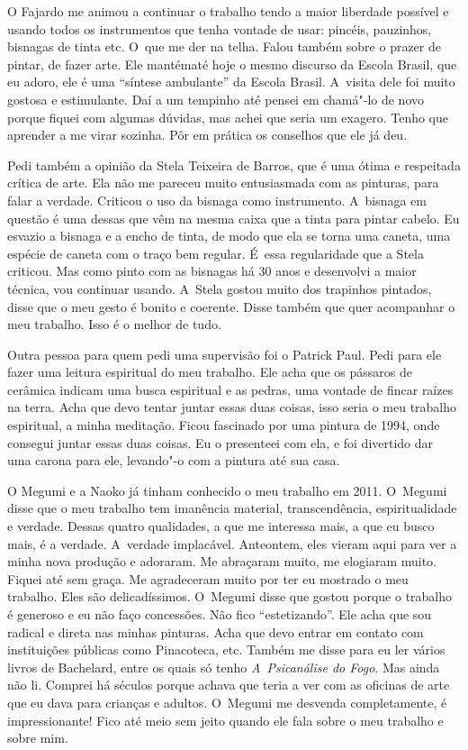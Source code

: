 O Fajardo me animou a continuar o trabalho tendo a maior liberdade
possível e usando todos os instrumentos que tenha vontade de usar:
pincéis, pauzinhos, bisnagas de tinta etc. O~que me der na telha. Falou
também sobre o prazer de pintar, de fazer arte. Ele mantématé hoje o
mesmo discurso da Escola Brasil, que eu adoro, ele é uma ``síntese
ambulante'' da Escola Brasil. A~visita dele foi muito gostosa e
estimulante. Daí a um tempinho até pensei em chamá"-lo de novo porque
fiquei com algumas dúvidas, mas achei que seria um exagero. Tenho que
aprender a me virar sozinha. Pôr em prática os conselhos que ele já deu.

Pedi também a opinião da Stela Teixeira de Barros, que é uma ótima e
respeitada crítica de arte. Ela não me pareceu muito entusiasmada com as
pinturas, para falar a verdade. Criticou o uso da bisnaga como
instrumento. A~bisnaga em questão é uma dessas que vêm na mesma caixa
que a tinta para pintar cabelo. Eu esvazio a bisnaga e a encho de tinta,
de modo que ela se torna uma caneta, uma espécie de caneta com o traço
bem regular. É~essa regularidade que a Stela criticou. Mas como pinto
com as bisnagas há 30 anos e desenvolvi a maior técnica, vou continuar
usando. A~Stela gostou muito dos trapinhos pintados, disse que o meu
gesto é bonito e coerente. Disse também que quer acompanhar o meu
trabalho. Isso é o melhor de tudo.

Outra pessoa para quem pedi uma supervisão foi o Patrick Paul. Pedi para
ele fazer uma leitura espiritual do meu trabalho. Ele acha que os
pássaros de cerâmica indicam uma busca espiritual e as pedras, uma
vontade de fincar raízes na terra. Acha que devo tentar juntar essas
duas coisas, isso seria o meu trabalho espiritual, a minha meditação.
Ficou fascinado por uma pintura de 1994, onde consegui juntar essas duas
coisas. Eu o presenteei com ela, e foi divertido dar uma carona para
ele, levando"-o com a pintura até sua casa.

O Megumi e a Naoko já tinham conhecido o meu trabalho em 2011. O~Megumi
disse que o meu trabalho tem imanência material, transcendência,
espiritualidade e verdade. Dessas quatro qualidades, a que me interessa
mais, a que eu busco mais, é a verdade. A~verdade implacável. Anteontem,
eles vieram aqui para ver a minha nova produção e adoraram. Me abraçaram
muito, me elogiaram muito. Fiquei até sem graça. Me agradeceram muito
por ter eu mostrado o meu trabalho. Eles são delicadíssimos. O~Megumi
disse que gostou porque o trabalho é generoso e eu não faço concessões.
Não fico ``estetizando''. Ele acha que sou radical e direta nas minhas
pinturas. Acha que devo entrar em contato com instituições públicas como
Pinacoteca,  etc. Também me disse para eu ler vários livros de
Bachelard, entre os quais só tenho \emph{A~Psicanálise do Fogo}. Mas
ainda não li. Comprei há séculos porque achava que teria a ver com as
oficinas de arte que eu dava para crianças e adultos. O~Megumi me
desvenda completamente, é impressionante! Fico até meio sem jeito quando
ele fala sobre o meu trabalho e sobre mim.

